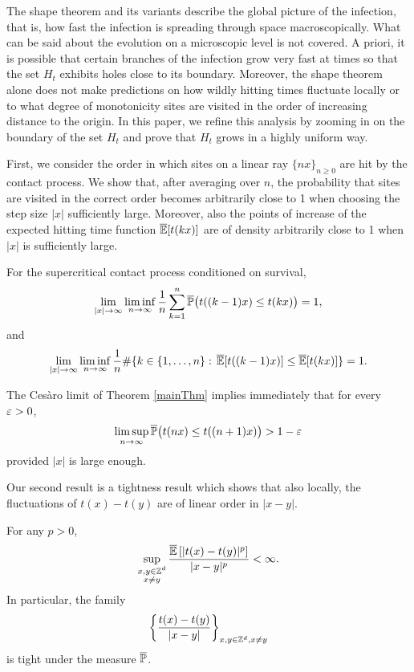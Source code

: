 The shape theorem and its variants describe the global picture of the infection, that is, how fast the infection is spreading through space macroscopically. What can be said about the evolution on a microscopic level is not covered. A priori, it is possible that certain branches of the infection grow very fast at times so that the set $H_t$ exhibits holes close to its boundary. Moreover, the shape theorem alone does not make predictions on how wildly hitting times fluctuate locally or to what degree of monotonicity sites are visited in the order of increasing distance to the origin. In this paper, we refine this analysis by zooming in on the boundary of the set $H_t$ and prove that $H_t$ grows in a highly uniform way. 

First, we consider the order in which sites on a linear ray $\{nx\}_{n \ge 0}$ are hit by the contact process. We show that, after averaging over $n$, the probability that sites are visited in the correct order becomes arbitrarily close to 1 when choosing the step size $|x|$ sufficiently large. Moreover, also the points of increase of the expected hitting time function $\overline{\mathbb{E}}[t(kx)]$ are of density arbitrarily close to 1 when $|x|$ is sufficiently large.
\begin{theorem}
	\label{mainThm}
	For the supercritical contact process conditioned on survival, 
	$$\lim_{|x| \to \infty}\liminf_{n \to \infty} \frac1n \sum_{k=1}^n \overline{\mathbb{P}}\big(t({(k-1)x}) \le t({k x})\big) = 1,$$
	and 
	$$\lim_{|x| \to \infty}\liminf_{n \to \infty} \frac1n \#\{k \in \{1,\ldots ,n\}:\, \overline{\mathbb{E}}[t({(k-1)x})] \le \overline{\mathbb{E}}[t({kx})] \} = 1.$$
\end{theorem}

The Ces\`aro limit of Theorem \ref{mainThm} implies immediately that for every $\varepsilon > 0$,
\begin{equation}\label{eq:limsup}
	\limsup_{n \to \infty} \overline{\mathbb{P}}\big(t({nx}) \le t({(n+1) x})\big)>1-\varepsilon 
\end{equation}
provided $|x|$ is large enough. 

Our second result is a tightness result which shows that also locally, the fluctuations of $t(x) - t(y)$ are of linear order in $|x - y|$.  
\begin{theorem}[Tightness]\label{thmTightness}
For any $p>0$, 
	$$\sup_{\substack{x,y\in{\mathbb{Z}^d} \\ x \ne y}} \frac{\overline{\mathbb{E}}\left[|t(x) - t(y)|^p \right]}{|x-y|^p}  < \infty.$$
	In particular, the family
	$$\left\{\frac{t(x) - t(y)}{|x-y|}\right\}_{x, y \in {\mathbb{Z}^d}, x \ne y}$$
is {tight} under the measure $\overline{\mathbb{P}}$. 
\end{theorem} 

